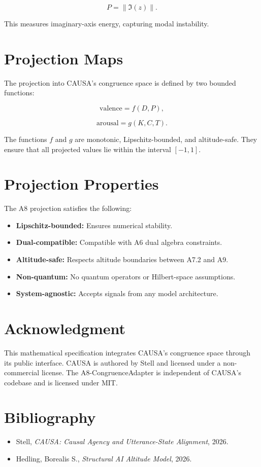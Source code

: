 \documentclass[11pt]{article}
\begin{document}
\[
P = \|\Im(z)\|.
\]

This measures imaginary-axis energy, capturing modal instability.

\section{Projection Maps}

The projection into CAUSA's congruence space is defined by two bounded 
functions:

\[
\text{valence} = f(D, P),
\]

\[
\text{arousal} = g(K, C, T).
\]

The functions $f$ and $g$ are monotonic, Lipschitz-bounded, and altitude-safe. 
They ensure that all projected values lie within the interval $[-1,1]$.

\section{Projection Properties}

The A8 projection satisfies the following:

\begin{itemize}[leftmargin=2em]
\item \textbf{Lipschitz-bounded:} Ensures numerical stability.
\item \textbf{Dual-compatible:} Compatible with A6 dual algebra constraints.
\item \textbf{Altitude-safe:} Respects altitude boundaries between A7.2 and A9.
\item \textbf{Non-quantum:} No quantum operators or Hilbert-space assumptions.
\item \textbf{System-agnostic:} Accepts signals from any model architecture.
\end{itemize}

\section{Acknowledgment}

This mathematical specification integrates CAUSA's congruence space through 
its public interface. CAUSA is authored by Stell and licensed under a 
non-commercial license. The A8-CongruenceAdapter is independent of CAUSA's 
codebase and is licensed under MIT.

\section{Bibliography}

\begin{itemize}[leftmargin=2em]
\item Stell, \textit{CAUSA: Causal Agency and Utterance-State Alignment}, 2026.
\item Hedling, Borealis S., \textit{Structural AI Altitude Model}, 2026.
\end{itemize}
\end{document}
